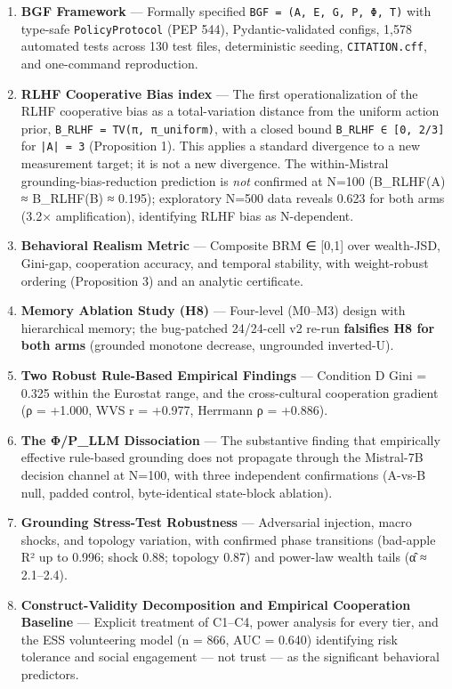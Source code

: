 
\begin{enumerate}
\item \textbf{BGF Framework} — Formally specified \texttt{BGF = (A, E, G, P, Φ, T)} with type-safe \texttt{PolicyProtocol} (PEP 544), Pydantic-validated configs, 1,578 automated tests across 130 test files, deterministic seeding, \texttt{CITATION.cff}, and one-command reproduction.
\item \textbf{RLHF Cooperative Bias index} — The first operationalization of the RLHF cooperative bias as a total-variation distance from the uniform action prior, \texttt{B\_RLHF = TV(π, π\_uniform)}, with a closed bound \texttt{B\_RLHF ∈ [0, 2/3]} for \texttt{|A| = 3} (Proposition 1). This applies a standard divergence to a new measurement target; it is not a new divergence. The within-Mistral grounding-bias-reduction prediction is \textit{not} confirmed at N=100 (B\_RLHF(A) ≈ B\_RLHF(B) ≈ 0.195); exploratory N=500 data reveals 0.623 for both arms (3.2× amplification), identifying RLHF bias as N-dependent.
\item \textbf{Behavioral Realism Metric} — Composite BRM ∈ [0,1] over wealth-JSD, Gini-gap, cooperation accuracy, and temporal stability, with weight-robust ordering (Proposition 3) and an analytic certificate.
\item \textbf{Memory Ablation Study (H8)} — Four-level (M0–M3) design with hierarchical memory; the bug-patched 24/24-cell v2 re-run \textbf{falsifies H8 for both arms} (grounded monotone decrease, ungrounded inverted-U).
\item \textbf{Two Robust Rule-Based Empirical Findings} — Condition D Gini = 0.325 within the Eurostat range, and the cross-cultural cooperation gradient (ρ = +1.000, WVS r = +0.977, Herrmann ρ = +0.886).
\item \textbf{The Φ/P\_LLM Dissociation} — The substantive finding that empirically effective rule-based grounding does not propagate through the Mistral-7B decision channel at N=100, with three independent confirmations (A-vs-B null, padded control, byte-identical state-block ablation).
\item \textbf{Grounding Stress-Test Robustness} — Adversarial injection, macro shocks, and topology variation, with confirmed phase transitions (bad-apple R² up to 0.996; shock 0.88; topology 0.87) and power-law wealth tails (α̂ ≈ 2.1–2.4).
\item \textbf{Construct-Validity Decomposition and Empirical Cooperation Baseline} — Explicit treatment of C1–C4, power analysis for every tier, and the ESS volunteering model (n = 866, AUC = 0.640) identifying risk tolerance and social engagement — not trust — as the significant behavioral predictors.

\end{enumerate}
